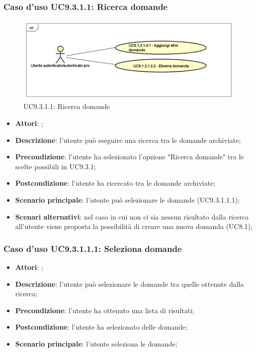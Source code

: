 		 \subsubsection{Caso d'uso UC9.3.1.1: Ricerca domande}
		 \label{UC9.3.1.1}
		 \begin{figure}[h]
		 	\centering
		 	\includegraphics[scale=0.5,keepaspectratio]{UML/UC9_3_1_1.png}
		 	\caption{UC9.3.1.1: Ricerca domande}
		 \end{figure}
		 \FloatBarrier
		 \begin{itemize}
		 	\item \textbf{Attori}: \uaupro;
		 	\item \textbf{Descrizione}: l'utente può eseguire una ricerca tra le domande archiviate; 
		 	\item \textbf{Precondizione}: l'utente ha selezionato l'opzione "Ricerca domande" tra le scelte possibili in UC9.3.1;
		 	\item \textbf{Postcondizione}: l'utente ha ricercato tra le domande archiviate;
		 	\item \textbf{Scenario principale}: l'utente può selezionare le domande (UC9.3.1.1.1); 
		 	\item \textbf{Scenari alternativi}: nel caso in cui non ci sia nessun risultato dalla ricerca all'utente viene proposta la possibilità di creare una nuova domanda (UC8.1);
		 \end{itemize}
		 
		 \subsubsection{Caso d'uso UC9.3.1.1.1: Seleziona domande}
		 \label{UC9.3.1.1.1}
		 \begin{itemize}
		 	\item \textbf{Attori}: \uaupro;
		 	\item \textbf{Descrizione}: l'utente può selezionare le domande tra quelle ottenute dalla ricerca;
		 	\item \textbf{Precondizione}: l'utente ha ottenuto una lista di risultati;
		 	\item \textbf{Postcondizione}: l'utente ha selezionato delle domande; 
		 	\item \textbf{Scenario principale}: l'utente seleziona le domande;
		 \end{itemize}
		 
